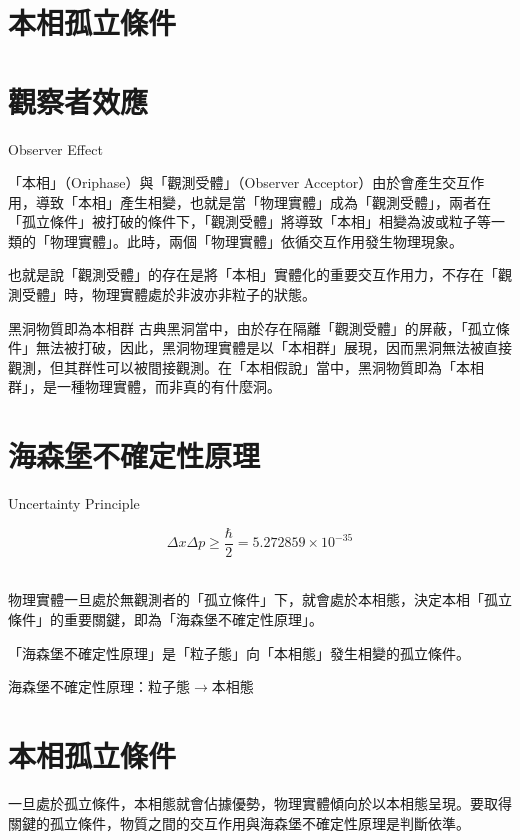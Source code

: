 \documentclass[a4paper,notitlepage,UTF8]{ctexart}
\begin{document}
\section{本相孤立條件}



\section{觀察者效應}

Observer Effect

「本相」（Oriphase）與「觀測受體」（Observer Acceptor）由於會產生交互作用，導致「本相」產生相變，也就是當「物理實體」成為「觀測受體」，兩者在「孤立條件」被打破的條件下，「觀測受體」將導致「本相」相變為波或粒子等一類的「物理實體」。此時，兩個「物理實體」依循交互作用發生物理現象。

也就是說「觀測受體」的存在是將「本相」實體化的重要交互作用力，不存在「觀測受體」時，物理實體處於非波亦非粒子的狀態。

黑洞物質即為本相群
古典黑洞當中，由於存在隔離「觀測受體」的屏蔽，「孤立條件」無法被打破，因此，黑洞物理實體是以「本相群」展現，因而黑洞無法被直接觀測，但其群性可以被間接觀測。在「本相假說」當中，黑洞物質即為「本相群」，是一種物理實體，而非真的有什麼洞。



\section{海森堡不確定性原理}

Uncertainty Principle
\\
\begin{large}
$$ \Delta x \Delta p \geq \frac{\hbar}{2} = 5.272859 \times 10^{-35} $$
\end{large}
\\

物理實體一旦處於無觀測者的「孤立條件」下，就會處於本相態，決定本相「孤立條件」的重要關鍵，即為「海森堡不確定性原理」。

「海森堡不確定性原理」是「粒子態」向「本相態」發生相變的孤立條件。

海森堡不確定性原理：粒子態$\rightarrow$本相態

\section{本相孤立條件}

一旦處於孤立條件，本相態就會佔據優勢，物理實體傾向於以本相態呈現。要取得關鍵的孤立條件，物質之間的交互作用與海森堡不確定性原理是判斷依準。
\end{document}
